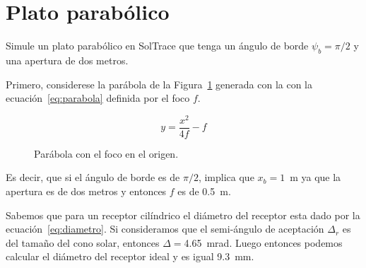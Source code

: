 \section{Plato parabólico}
\label{sec:plato}

\begin{problem}
Simule un plato parabólico en SolTrace que tenga un ángulo de borde $\psi_b = \pi/2$ y una apertura de dos metros.  
\end{problem}



\TheSolution Primero, considerese la parábola de la Figura~\ref{fig:parabola} generada con la con la ecuación~\eqref{eq:parabola} definida por el foco $f$.

\begin{equation}
  \label{eq:parabola}
  y = \dfrac{x^2}{4f} -f
\end{equation}


\begin{figure}[ht]
  \centering
  \caption{\label{fig:parabola} Parábola con el foco en el origen.}
\end{figure}

Es decir, que si el ángulo de borde es de $\pi/2$, implica que $x_b=1$~m ya que la apertura es de dos metros y entonces $f$ es de 0.5~m.

Sabemos\cite{Rabl1985active} que para un receptor cilíndrico el diámetro del receptor esta dado por la ecuación~\eqref{eq:diametro}. Si consideramos que el semi-ángulo de aceptación $\Delta_r$ es del tamaño del cono solar, entonces $\Delta = $4.65~mrad. Luego entonces podemos calcular el diámetro del receptor ideal y es igual 9.3~mm.



